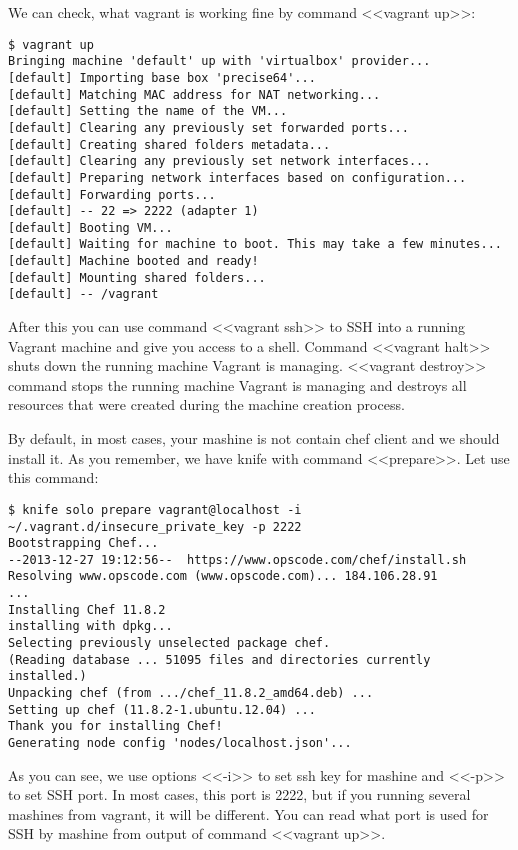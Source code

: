 We can check, what vagrant is working fine by command <<vagrant up>>:

\begin{lstlisting}[label=lst:my-cloud-vagrant4,title=my-cloud/nodes/Vagrantfile]
$ vagrant up
Bringing machine 'default' up with 'virtualbox' provider...
[default] Importing base box 'precise64'...
[default] Matching MAC address for NAT networking...
[default] Setting the name of the VM...
[default] Clearing any previously set forwarded ports...
[default] Creating shared folders metadata...
[default] Clearing any previously set network interfaces...
[default] Preparing network interfaces based on configuration...
[default] Forwarding ports...
[default] -- 22 => 2222 (adapter 1)
[default] Booting VM...
[default] Waiting for machine to boot. This may take a few minutes...
[default] Machine booted and ready!
[default] Mounting shared folders...
[default] -- /vagrant
\end{lstlisting}

After this you can use command <<vagrant ssh>> to SSH into a running Vagrant machine and give you access to a shell. Command <<vagrant halt>> shuts down the running machine Vagrant is managing. <<vagrant destroy>> command stops the running machine Vagrant is managing and destroys all resources that were created during the machine creation process.

By default, in most cases, your mashine is not contain chef client and we should install it. As you remember, we have knife with command <<prepare>>. Let use this command:

\begin{lstlisting}[label=lst:my-cloud-vagrant5,title=my-cloud/nodes/Vagrantfile]
$ knife solo prepare vagrant@localhost -i ~/.vagrant.d/insecure_private_key -p 2222
Bootstrapping Chef...
--2013-12-27 19:12:56--  https://www.opscode.com/chef/install.sh
Resolving www.opscode.com (www.opscode.com)... 184.106.28.91
...
Installing Chef 11.8.2
installing with dpkg...
Selecting previously unselected package chef.
(Reading database ... 51095 files and directories currently installed.)
Unpacking chef (from .../chef_11.8.2_amd64.deb) ...
Setting up chef (11.8.2-1.ubuntu.12.04) ...
Thank you for installing Chef!
Generating node config 'nodes/localhost.json'...
\end{lstlisting}

As you can see, we use options <<-i>> to set ssh key for mashine and <<-p>> to set SSH port. In most cases, this port is 2222, but if you running several mashines from vagrant, it will be different. You can read what port is used for SSH by mashine from output of command <<vagrant up>>.

